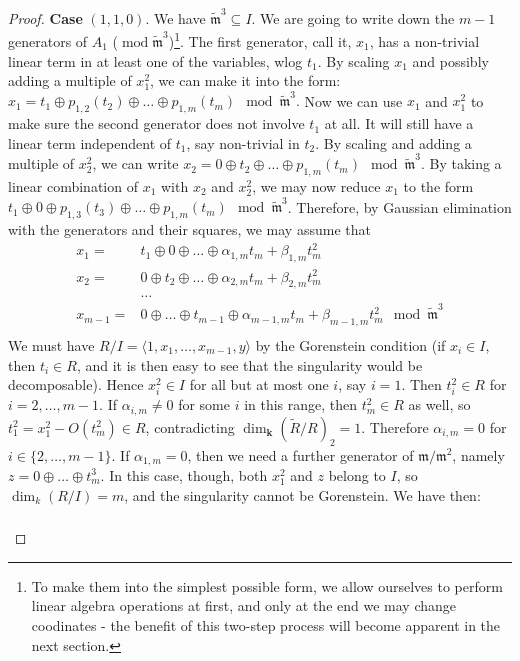 \documentclass[11pt]{amsart}
\renewcommand{\k}{\mathbf k}
\newcommand{\m}{\mathfrak m}
\newcommand{\tR}{\widetilde{R}}
\newcommand{\tm}{\widetilde{\mathfrak m}}
\theoremstyle{plain}
\theoremstyle{definition}
\begin{document}
\begin{proof}
 \textbf{Case} $(1,1,0)$. We have $\tm^3\subseteq I$. We are going to write down the $m-1$ generators of $A_1$ ($\operatorname{mod} \tm^3$)\footnote{To make them into the simplest possible form, we allow ourselves to perform linear algebra operations at first, and only at the end we may change coodinates - the benefit of this two-step process will become apparent in the next section.}. The first generator, call it, $x_1$, has a non-trivial linear term in at least one of the variables, wlog $t_1$. By scaling $x_1$ and possibly adding a multiple of $x_1^2$, we can make it into the form:
 $x_1=t_1\oplus p_{1,2}(t_2)\oplus\ldots\oplus p_{1,m}(t_m) \mod\tm^3.$ Now we can use $x_1$ and $x_1^2$ to make sure the second generator does not involve $t_1$ at all. It will still have a linear term independent of $t_1$, say non-trivial in $t_2$. By scaling and adding a multiple of $x_2^2$, we can write $x_2=0\oplus t_2\oplus\ldots\oplus p_{1,m}(t_m) \mod\tm^3.$ By taking a linear combination of $x_1$ with $x_2$ and $x_2^2$, we may now reduce $x_1$ to the form $t_1\oplus0\oplus p_{1,3}(t_3)\oplus\ldots\oplus p_{1,m}(t_m)\mod\tm^3$. Therefore, by Gaussian elimination with the generators and their squares, we may assume that
 \begin{align*}
  x_1= & t_1\oplus0\oplus\ldots\oplus\alpha_{1,m}t_m+\beta_{1,m}t_m^2\\
  x_2= & 0\oplus t_2\oplus\ldots\oplus\alpha_{2,m}t_m+\beta_{2,m}t_m^2\\
  &\ldots\\
  x_{m-1}= & 0\oplus\ldots\oplus t_{m-1}\oplus\alpha_{m-1,m}t_m+\beta_{m-1,m}t_m^2 \mod \tm^3\\
 \end{align*}
 We must have $R/I=\langle 1,x_1,\ldots,x_{m-1},y\rangle$ by the Gorenstein condition (if $x_i\in I$, then $t_i\in R$, and it is then easy to see that the singularity would be decomposable). Hence $x_i^2\in I$ for all but at most one $i$, say $i=1$. Then $t_i^2\in R$ for $i=2,\ldots,m-1$. If $\alpha_{i,m}\neq 0$ for some $i$ in this range, then $t_m^2\in R$ as well, so $t_1^2=x_1^2-O(t_m^2)\in R$, contradicting $\dim_\k(\tR/R)_2=1$. Therefore $\alpha_{i,m}=0$ for $i\in\{2,\ldots,m-1\}$. If $\alpha_{1,m}=0$, then we need a further generator of $\m/\m^2$, namely $z=0\oplus\ldots\oplus t_m^3$. In this case, though, both $x_1^2$ and $z$ belong to $I$, so $\dim_k(R/I)=m$, and the singularity cannot be Gorenstein. We have then:
 \begin{align}\label{coordII-cs}
 \begin{split}

\end{split}
\end{align}
\end{proof}
\end{document}
